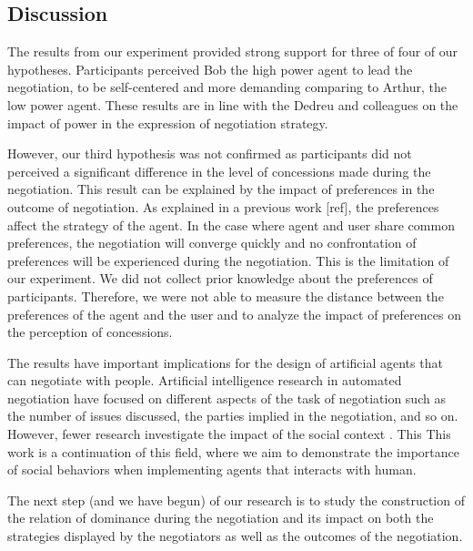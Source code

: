 \documentclass[runningheads,a4paper]{llncs}
\begin{document}
		\subsection{Discussion}
		The results from our experiment provided strong support for three of four of our hypotheses. Participants perceived Bob the high power agent to lead the negotiation, to be self-centered and more demanding comparing to Arthur, the low power agent. These results are in line with the Dedreu and colleagues on the impact of power in the expression of negotiation strategy.  
		
		However, our third hypothesis was not confirmed as participants did not perceived a significant difference in the level of concessions made during the negotiation. This result can be explained by the impact of preferences in the outcome of negotiation. As explained in a previous work [ref], the preferences affect the strategy of the agent. In the case where agent and user share common preferences, the negotiation will converge quickly and no confrontation of preferences will be experienced during the negotiation. This is the limitation of our experiment. We did not collect prior knowledge about the preferences of participants. Therefore, we were not able to measure the distance between the preferences of the agent and the user and to analyze the impact of preferences on the perception of concessions.
		
		The results have important implications for the design of artificial agents that can negotiate with people. Artificial
		intelligence research in automated negotiation have focused on different aspects of the task of negotiation such as the number of issues discussed, the parties implied in the negotiation, and so on. However, fewer research investigate the impact of the social context \cite{de2011effect,nazari2015opponent}. This This work is a continuation of this field, where we aim to demonstrate the importance of social behaviors when implementing agents that interacts with human. 
		
		The next step (and we have begun) of our research is to study the construction of the relation of dominance during the negotiation and its impact on both the strategies displayed by the negotiators as well as the outcomes of the negotiation.
		
\scriptsize{	
	
	}
\end{document}
